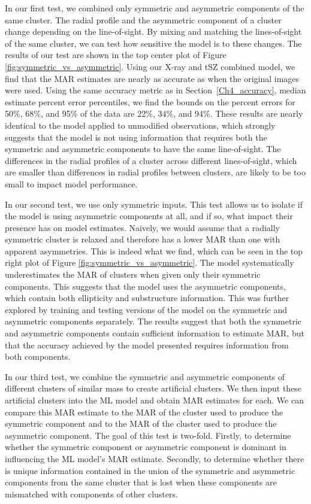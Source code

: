 In our first test, we combined only symmetric and asymmetric components of the same cluster. The radial profile and the asymmetric component of a cluster change depending on the line-of-sight. By mixing and matching the lines-of-sight of the same cluster, we can test how sensitive the model is to these changes. The results of our test are shown in the top center plot of Figure \ref{fig:symmetric_vs_asymmetric}. Using our X-ray and tSZ combined model, we find that the MAR estimates are nearly as accurate as when the original images were used. Using the same accuracy metric as in Section~\ref{Ch4_accuracy}, median estimate percent error percentiles, we find the bounds on the percent errors for 50\%, 68\%, and 95\% of the data are 22\%, 34\%, and 94\%. These results are nearly identical to the model applied to unmodified observations, which strongly suggests that the model is not using information that requires both the symmetric and asymmetric components to have the same line-of-sight. The differences in the radial profiles of a cluster across different lines-of-sight, which are smaller than differences in radial profiles between clusters, are likely to be too small to impact model performance.


In our second test, we use only symmetric inputs. This test allows us to isolate if the model is using asymmetric components at all, and if so, what impact their presence has on model estimates. Naively, we would assume that a radially symmetric cluster is relaxed and therefore has a lower MAR than one with apparent asymmetries. This is indeed what we find, which can be seen in the top right plot of Figure \ref{fig:symmetric_vs_asymmetric}. The model systematically underestimates the MAR of clusters when given only their symmetric components. This suggests that the model uses the asymmetric components, which contain both ellipticity and substructure information. This was further explored by training and testing versions of the model on the symmetric and asymmetric components separately. The results suggest that both the symmetric and asymmetric components contain sufficient information to estimate MAR, but that the accuracy achieved by the model presented requires information from both components.

In our third test, we combine the symmetric and asymmetric components of different clusters of similar mass to create artificial clusters. We then input these artificial clusters into the ML model and obtain MAR estimates for each. We can compare this MAR estimate to the MAR of the cluster used to produce the symmetric component and to the MAR of the cluster used to produce the asymmetric component. The goal of this test is two-fold. Firstly, to determine whether the symmetric component or asymmetric component is dominant in influencing the ML model's MAR estimate. Secondly, to determine whether there is unique information contained in the union of the symmetric and asymmetric components from the same cluster that is lost when these components are mismatched with components of other clusters.

